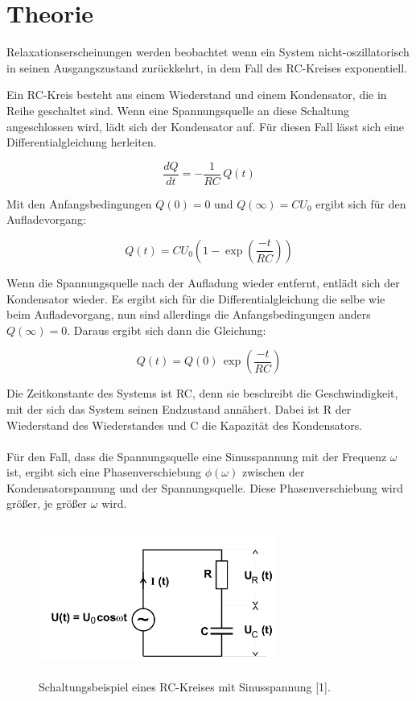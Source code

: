 \section{Theorie}


Relaxationserscheinungen werden beobachtet wenn ein System nicht-oszillatorisch
in seinen Ausgangszustand zurückkehrt, in dem Fall des RC-Kreises exponentiell.

Ein RC-Kreis besteht aus einem Wiederstand und einem Kondensator, die in Reihe
geschaltet sind. Wenn eine Spannungsquelle an diese Schaltung angeschlossen wird,
lädt sich der Kondensator auf. Für diesen Fall lässt sich eine Differentialgleichung
herleiten.

\begin{equation}
  \frac{dQ}{dt} = -\frac{1}{RC}\, Q(t)
  \label{eq:1}
\end{equation}

Mit den Anfangsbedingungen $Q(0)=0$ und $Q(\infty)= CU_0$ ergibt sich für den Aufladevorgang:

\begin{equation}
  Q(t) = CU_0 \left(1 - \exp\left(\frac{-t}{RC}\right)\right)
  \label{eq:2}
\end{equation}

Wenn die Spannungsquelle nach der Aufladung wieder entfernt, entlädt sich der Kondensator
wieder. Es ergibt sich für die Differentialgleichung die selbe wie beim Aufladevorgang,
nun sind allerdings die Anfangsbedingungen anders $Q(\infty) = 0$. Daraus ergibt sich dann
die Gleichung:

\begin{equation}
  Q(t) = Q(0)\, \exp\left(\frac{-t}{RC}\right)
  \label{eq:3}
\end{equation}

Die Zeitkonstante des Systems ist RC, denn sie beschreibt die Geschwindigkeit, mit
der sich das System seinen Endzustand annähert. Dabei ist R der Wiederstand des Wiederstandes
und C die Kapazität des Kondensators.\\\\

Für den Fall, dass die Spannungsquelle eine Sinusspannung mit der Frequenz $\omega$
ist, ergibt sich eine Phasenverschiebung $\phi(\omega)$ zwischen der Kondensatorspannung
und der Spannungsquelle. Diese Phasenverschiebung wird größer, je größer $\omega$ wird.

\begin{figure}
  \centering
  \includegraphics[height=5cm, width=0.7\textwidth]{Schaltungsbeispiel.png}
  \caption{Schaltungsbeispiel eines RC-Kreises mit Sinusspannung [1].}
  \label{fig:1}
\end{figure}

